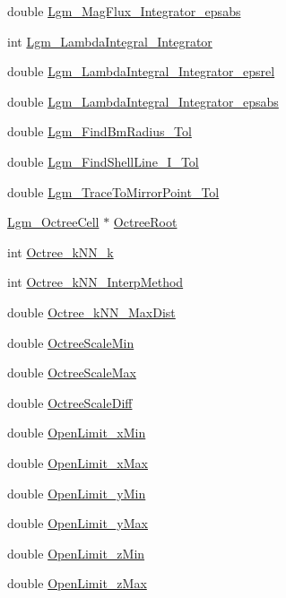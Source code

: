 \begin{CompactItemize}
\item 
double \hyperlink{struct_lgm___mag_model_info_2659eea0c59fae87e7ac738542e00128}{Lgm\_\-MagFlux\_\-Integrator\_\-epsabs}
\item 
int \hyperlink{struct_lgm___mag_model_info_a3ec6fe0176592c49bb9f25f9fd05a71}{Lgm\_\-LambdaIntegral\_\-Integrator}
\item 
double \hyperlink{struct_lgm___mag_model_info_c2e550303cccbc0f08c3d46975f79111}{Lgm\_\-LambdaIntegral\_\-Integrator\_\-epsrel}
\item 
double \hyperlink{struct_lgm___mag_model_info_84e45c331b0974d7470a7c5796550069}{Lgm\_\-LambdaIntegral\_\-Integrator\_\-epsabs}
\item 
double \hyperlink{struct_lgm___mag_model_info_87d9547dc23285cacd4e7eb0a4fa81c8}{Lgm\_\-FindBmRadius\_\-Tol}
\item 
double \hyperlink{struct_lgm___mag_model_info_aa3a6471b016a88d0c199e4689b5115b}{Lgm\_\-FindShellLine\_\-I\_\-Tol}
\item 
double \hyperlink{struct_lgm___mag_model_info_371678dd73a628d7a7e92195a977f2ab}{Lgm\_\-TraceToMirrorPoint\_\-Tol}
\item 
\hyperlink{struct___lgm___octree_cell}{Lgm\_\-OctreeCell} $\ast$ \hyperlink{struct_lgm___mag_model_info_3c296eee871865d5eb14f0e46f242d52}{OctreeRoot}
\item 
int \hyperlink{struct_lgm___mag_model_info_99cfcbf0b2cc678489e5610f95ba444f}{Octree\_\-kNN\_\-k}
\item 
int \hyperlink{struct_lgm___mag_model_info_5f46c646591dc34aa1dd15ae784de211}{Octree\_\-kNN\_\-InterpMethod}
\item 
double \hyperlink{struct_lgm___mag_model_info_8bb4098863c80f1488ba2210a992c1c7}{Octree\_\-kNN\_\-MaxDist}
\item 
double \hyperlink{struct_lgm___mag_model_info_010feefec439ccf0a4dbb5b3d1599e36}{OctreeScaleMin}
\item 
double \hyperlink{struct_lgm___mag_model_info_0310164485c1dbf6298b11f23531d42f}{OctreeScaleMax}
\item 
double \hyperlink{struct_lgm___mag_model_info_593eb3c7aeb022b668650a364f4a436e}{OctreeScaleDiff}
\item 
double \hyperlink{struct_lgm___mag_model_info_7d6b092f69ab45a5532b1bbc137afd0c}{OpenLimit\_\-xMin}
\item 
double \hyperlink{struct_lgm___mag_model_info_f97947f7418eed4c17c0668e8bc3cd4e}{OpenLimit\_\-xMax}
\item 
double \hyperlink{struct_lgm___mag_model_info_97e8920e1c6dd24c5cff164113bf05b3}{OpenLimit\_\-yMin}
\item 
double \hyperlink{struct_lgm___mag_model_info_abc524710dd7b86daa257d70347b2c23}{OpenLimit\_\-yMax}
\item 
double \hyperlink{struct_lgm___mag_model_info_f657d5c81e259de821321d7247c0a36d}{OpenLimit\_\-zMin}
\item 
double \hyperlink{struct_lgm___mag_model_info_8872d2067eaccc17854b021eb2db82a1}{OpenLimit\_\-zMax}
\end{CompactItemize}


